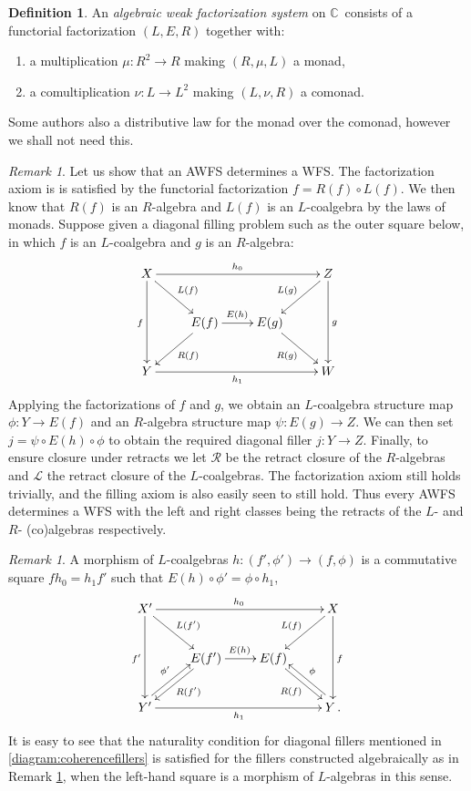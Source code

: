 \documentclass[12pt]{article}
\newcommand{\C}{\ensuremath{\mathbb{C}}}
\renewcommand{\L}{\ensuremath{\mathcal{L}}}
\newcommand{\R}{\ensuremath{\mathcal{R}}}
\theoremstyle{remark}
\newtheorem{remark}[theorem]{Remark}
\theoremstyle{definition}
\newtheorem{definition}[theorem]{Definition}
\begin{document}
\begin{definition}
An \emph{algebraic weak factorization system} on \C\ consists of a functorial factorization $(L,E,R)$ together with:
\begin{enumerate}
\item a  multiplication $\mu : R^2 \to R$ making $(R, \mu, L)$ a monad,
\item a comultiplication $\nu : L \to L^2$ making $(L, \nu, R)$ a comonad.
\end{enumerate}
Some authors also a distributive law for the monad over the comonad, however we shall not need this.
\end{definition}

\begin{remark}\label{AWFSisWFS} Let us show that an AWFS determines a WFS.  The factorization axiom is is satisfied by the functorial factorization $f = R(f)\circ L(f)$.  We then know that $R(f)$ is an $R$-algebra and $L(f)$ is an $L$-coalgebra by the laws of monads.  Suppose given a diagonal filling problem such as  the outer square below, in which $f$ is an $L$-coalgebra and $g$ is an $R$-algebra:
\[
\xymatrix{
X \ar[dd]_{f} \ar[rd]^{L(f)} \ar[rrr]^{h_0} &&& \ar[dd]^{g} \ar[ld]_{L(g)} Z\\
   & E(f) \ar[r]^{E(h)} \ar[ld]^{R(f)} & E(g) \ar[rd]_{R(g)} & \\
Y  \ar[rrr]_{h_1} &&&  W
}
\]
Applying the factorizations of $f$ and $g$, we obtain an $L$-coalgebra structure map $\phi : Y\to E(f)$ and an $R$-algebra structure map $\psi : E(g)\to Z$. We can then set $ j = \psi\circ E(h)\circ \phi$ to obtain the required diagonal filler $j : Y \to Z$.  Finally, to ensure closure under retracts we let $\R$ be the retract closure of the $R$-algebras and $\L$ the retract closure of the $L$-coalgebras.  The factorization axiom still holds trivially, and the filling axiom is also easily seen to still hold.  Thus every AWFS determines a WFS with the left and right classes being the retracts of the $L$- and $R$- (co)algebras respectively.
\end{remark}


\begin{remark} A morphism of $L$-coalgebras $h : (f',\phi')\to (f,\phi)$ is a commutative square $fh_0 = h_1f'$ such that $E(h)\circ\phi' = \phi\circ h_1$,
\[
\xymatrix{
X' \ar[dd]_{f'} \ar[rd]^{L(f')} \ar[rrr]^{h_0} &&& \ar[dd]^{f} \ar[ld]_{L(f)} X\\
   & E(f') \ar[r]^{E(h)} \ar[ld]^{R(f')} & E(f) \ar[rd]_{R(f)} & \\
Y'  \ar[rrr]_{h_1} \ar@<1ex>[ur]^{\phi'} &&& \ar@<-1ex>[ul]_{\phi} Y\,.
}
\]
%
It is easy to see that the naturality condition for diagonal fillers mentioned in \eqref{diagram:coherencefillers} is satisfied for the fillers constructed algebraically as in Remark \ref{AWFSisWFS}, when the left-hand square is a morphism of $L$-algebras in this sense.
\end{remark}
\end{document}

